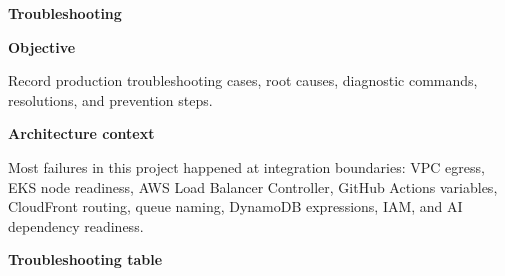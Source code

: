 \vspace{0.5em}\noindent\textbf{Troubleshooting}\par

\vspace{0.5em}\noindent\textbf{Objective}\par

Record production troubleshooting cases, root causes, diagnostic
commands, resolutions, and prevention steps.

\vspace{0.5em}\noindent\textbf{Architecture context}\par

Most failures in this project happened at integration boundaries: VPC
egress, EKS node readiness, AWS Load Balancer Controller, GitHub Actions
variables, CloudFront routing, queue naming, DynamoDB expressions, IAM,
and AI dependency readiness.

\vspace{0.5em}\noindent\textbf{Troubleshooting table}\par

